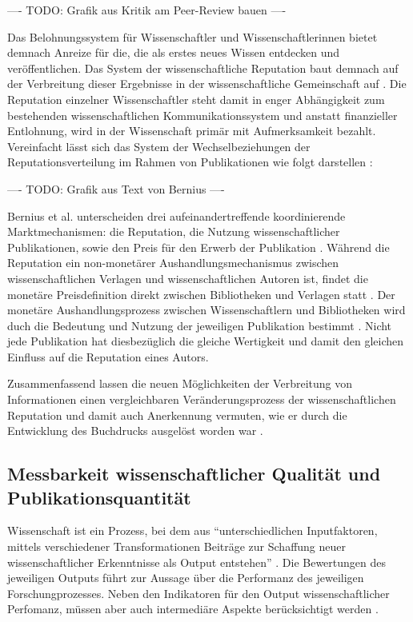 ---- TODO: Grafik aus Kritik am Peer-Review bauen \cite{mueller_2009_peerreview} ----

Das Belohnungssystem für Wissenschaftler und Wissenschaftlerinnen bietet demnach Anreize für die, die als erstes neues Wissen entdecken und veröffentlichen. Das System der wissenschaftliche Reputation baut demnach auf der Verbreitung dieser Ergebnisse in der wissenschaftliche Gemeinschaft auf \cite{Fabrizio_2008}. Die Reputation einzelner Wissenschaftler steht damit in enger Abhängigkeit zum bestehenden wissenschaftlichen Kommunikationssystem und anstatt finanzieller Entlohnung, wird in der Wissenschaft primär mit Aufmerksamkeit bezahlt. Vereinfacht lässt sich das System der Wechselbeziehungen der Reputationsverteilung im Rahmen von Publikationen wie folgt darstellen \cite{cite:21a}:

---- TODO: Grafik aus Text von Bernius ----

Bernius et al. unterscheiden drei aufeinandertreffende koordinierende Marktmechanismen: die Reputation, die Nutzung wissenschaftlicher Publikationen, sowie den Preis für den Erwerb der Publikation \cite{cite:21a}. Während die Reputation ein non-monetärer Aushandlungsmechanismus zwischen wissenschaftlichen Verlagen und wissenschaftlichen Autoren ist, findet die monetäre Preisdefinition direkt zwischen Bibliotheken und Verlagen statt \cite{EuropeanCommission_sciencepub_2006}. Der monetäre Aushandlungsprozess zwischen Wissenschaftlern und Bibliotheken wird duch die Bedeutung und Nutzung der jeweiligen Publikation bestimmt \cite{cite:21a}. Nicht jede Publikation hat diesbezüglich die gleiche Wertigkeit \cite{suchen} und damit den gleichen Einfluss auf die Reputation eines Autors.

Zusammenfassend lassen die neuen Möglichkeiten der Verbreitung von Informationen einen vergleichbaren Veränderungsprozess der wissenschaftlichen Reputation und damit auch Anerkennung vermuten, wie er durch die Entwicklung des Buchdrucks ausgelöst worden war \cite{hanekop_2006}.

\subsection{Messbarkeit wissenschaftlicher Qualität und Publikationsquantität}
Wissenschaft ist ein Prozess, bei dem aus “unterschiedlichen Inputfaktoren, mittels verschiedener Transformationen Beiträge zur Schaffung neuer wissenschaftlicher Erkenntnisse als Output entstehen” \cite{Jansen_2007}. Die Bewertungen des jeweiligen Outputs führt zur Aussage über die Performanz des jeweiligen Forschungprozesses. Neben den Indikatoren für den Output wissenschaftlicher Perfomanz, müssen aber auch intermediäre Aspekte berücksichtigt werden \cite{schmoch_2009}.


